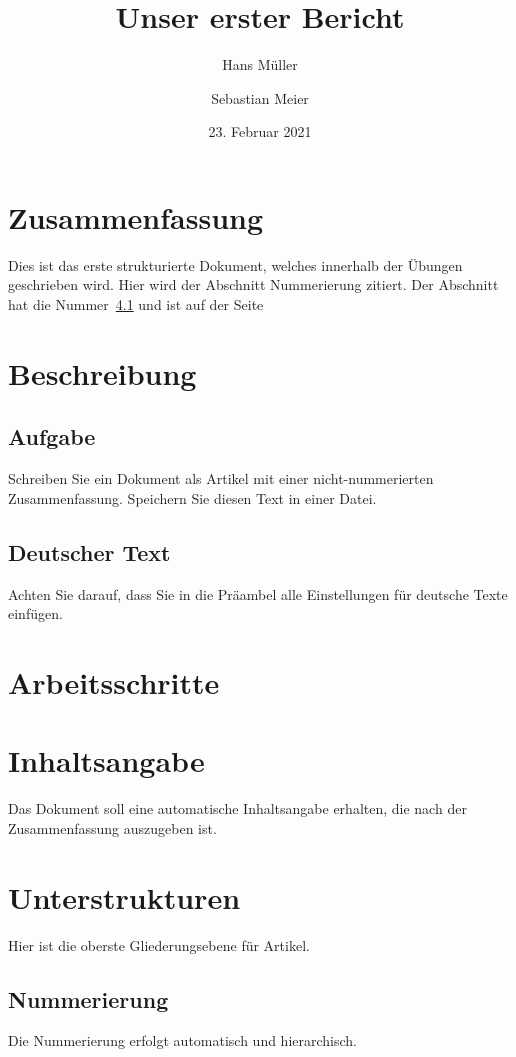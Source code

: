 \documentclass[a4paper, 12pt]{article} %
\begin{document}

\title{Unser erster Bericht}
\author{Hans Müller \and Sebastian Meier}
\date{23. Februar 2021}
\maketitle
\section*{Zusammenfassung}

Dies ist das erste strukturierte Dokument, welches innerhalb der Übungen
geschrieben wird. Hier wird der Abschnitt \dq Nummerierung\dq{} zitiert.
Der Abschnitt hat die Nummer~\ref{nummerierung} und ist 
auf der Seite~\pageref{nummerierung}
\tableofcontents

\section{Beschreibung}
\subsection{Aufgabe}\label{aufgabe}
Schreiben Sie ein Dokument als Artikel mit einer nicht-nummerierten
Zusammenfassung. Speichern Sie diesen Text in einer Datei.

\subsection{Deutscher Text}
Achten Sie darauf, dass Sie in die Präambel alle Einstellungen für 
deutsche Texte einfügen.

\section{Arbeitsschritte}

\section{Inhaltsangabe}
Das Dokument soll eine automatische Inhaltsangabe erhalten, die nach der 
Zusammenfassung auszugeben ist.

\section{Unterstrukturen}
Hier ist die oberste Gliederungsebene für Artikel.

\subsection{Nummerierung}\label{nummerierung}
Die Nummerierung erfolgt automatisch und hierarchisch.
\end{document}
